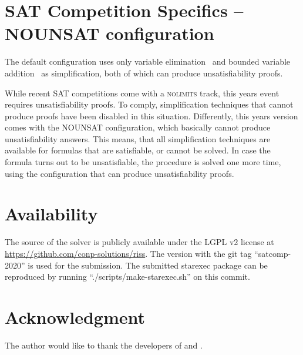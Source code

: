 \documentclass[conference]{IEEEtran}
\begin{document}
\section{SAT Competition Specifics -- NOUNSAT configuration}

The default configuration uses only variable elimination~\cite{EenB:2005} and bounded variable addition~\cite{Mbva} as simplification, both of which can produce unsatisfiability proofs.
\newpage

While recent SAT competitions come with a \textsc{nolimits} track, this years event requires unsatisfiability proofs.
To comply, simplification techniques that cannot produce proofs have been disabled in this situation.
Differently, this years version comes with the \textsc{NOUNSAT} configuration, which basically cannot produce unsatisfiability answers.
This means, that all simplification techniques are available for formulas that are satisfiable, or cannot be solved.
In case the formula turns out to be unsatisfiable, the procedure is solved one more time, using the configuration that can produce unsatisfiability proofs.

\section{Availability}

The source of the solver is publicly available under the LGPL v2 license at \url{https://github.com/conp-solutions/riss}.
The version with the git tag ``satcomp-2020'' is used for the submission.
The submitted starexec package can be reproduced by running ``./scripts/make-starexec.sh'' on this commit.

\section*{Acknowledgment}
The author would like to thank the developers of \glucose and \minisat. 



\end{document}
